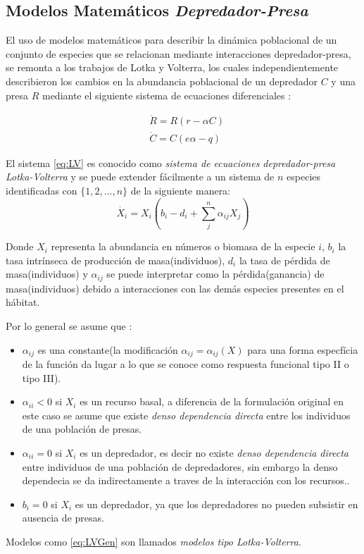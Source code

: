 

\subsection{Modelos Matem\'aticos \emph{Depredador-Presa}}

El uso de modelos matem\'aticos para describir la din\'amica poblacional de un conjunto de especies que se relacionan mediante interacciones depredador-presa, se remonta a los trabajos de Lotka y Volterra\citep{gotelliprimer}, los cuales independientemente describieron los cambios en la abundancia poblacional de un depredador $C$ y una presa $R$ mediante el siguiente sistema de ecuaciones diferenciales : 

\begin{equation}\label{eq:LV}
\begin{aligned}
&\dot{R} = R(r - \alpha C)\\
&\dot{C} = C(e\alpha - q) 
\end{aligned}
\end{equation}

El sistema \eqref{eq:LV} es conocido como \emph{sistema de ecuaciones depredador-presa Lotka-Volterra} y se puede extender f\'acilmente a un sistema de $n$ especies identificadas con $\{1,2, \ldots ,n\}$ de la siguiente manera:
\begin{equation}\label{eq:LVGen}
\dot{X_i}  = X_i(b_i - d_i + \sum_{j}^n \alpha_{ij} X_j)
\end{equation}

Donde $X_i$ representa la abundancia en n\'umeros o biomasa de la especie $i$, $b_i$ la tasa intr\'inseca de producci\'on de masa(individuos), $d_i$ la tasa de p\'erdida de masa(individuos) y $\alpha_{ij}$ se puede interpretar como la p\'erdida(ganancia) de masa(individuos) debido a interacciones con las dem\'as especies presentes en el h\'abitat.

Por lo general se asume que :
\begin{itemize}
\item $\alpha_{ij}$ es una constante(la modificaci\'on $\alpha_{ij} = \alpha_{ij}(X)$ para una forma especf\'icia de la funci\'on da lugar a lo que se conoce como respuesta funcional tipo II  o tipo III).
\item $\alpha_{ii} < 0 $ si $X_i$ es un recurso basal, a diferencia de la formulaci\'on original en este caso se asume que existe \emph{denso dependencia directa} entre los individuos de una poblaci\'on de presas.
\item $\alpha_{ii} = 0 $ si $X_i$ es un depredador, es decir no existe \emph{denso dependencia directa} entre individuos de una poblaci\'on de depredadores, sin embargo la denso dependecia se da indirectamente a traves de la interacci\'on con los recursos..
\item $b_i = 0$ si $X_i$ es un depredador, ya que los depredadores no pueden subsistir en ausencia de presas.
\end{itemize}
Modelos como \eqref{eq:LVGen} son llamados \emph{modelos tipo Lotka-Volterra}.

